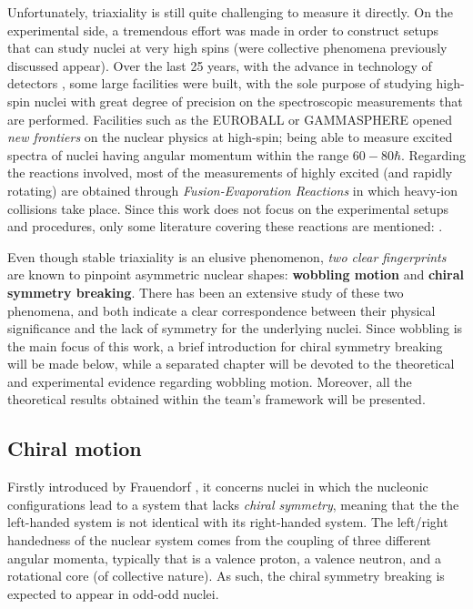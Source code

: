 Unfortunately, triaxiality is still quite challenging to measure it directly. On the experimental side, a tremendous effort was made in order to construct setups that can study nuclei at very high spins (were collective phenomena previously discussed appear). Over the last 25 years, with the advance in technology of detectors \cite{henning2012stability}, some large facilities were built, with the sole purpose of studying high-spin nuclei with great degree of precision on the spectroscopic measurements that are performed. Facilities such as the EUROBALL \cite{simpson1997euroball} or GAMMASPHERE \cite{lee1990gammasphere} opened \emph{new frontiers} on the nuclear physics at high-spin; being able to measure excited spectra of nuclei having angular momentum within the range $60-80\hbar$. Regarding the reactions involved, most of the measurements of highly excited (and rapidly rotating) are obtained through \emph{Fusion-Evaporation Reactions} in which heavy-ion collisions take place. Since this work does not focus on the experimental setups and procedures, only some literature covering these reactions are mentioned: \cite{gu2007theoretical,henning2012stability,ayangeakaa2013exotic,matta2017exotic,das2018nuclear,lewis2019lifetime,sensharma2021wobbling}.

Even though stable triaxiality is an elusive phenomenon, \emph{two clear fingerprints} are known to pinpoint asymmetric nuclear shapes: \textbf{wobbling motion} and \textbf{chiral symmetry breaking}. There has been an extensive study of these two phenomena, and both indicate a clear correspondence between their physical significance and the lack of symmetry for the underlying nuclei. Since wobbling is the main focus of this work, a brief introduction for chiral symmetry breaking will be made below, while a separated chapter will be devoted to the theoretical and experimental evidence regarding wobbling motion. Moreover, all the theoretical results obtained within the team's framework will be presented.

\subsection{Chiral motion}

Firstly introduced by Frauendorf \cite{frauendorf1997tilted}, it concerns nuclei in which the nucleonic configurations lead to a system that lacks \emph{chiral symmetry}, meaning that the the left-handed system is not identical with its right-handed system. The left/right handedness of the nuclear system comes from the coupling of three different angular momenta, typically that is a valence proton, a valence neutron, and a rotational core (of collective nature). As such, the chiral symmetry breaking is expected to appear in odd-odd nuclei.

